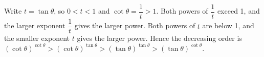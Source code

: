 Write $t=\tan\theta$, so $0<t<1$ and $\cot\theta=\dfrac{1}{t}>1$. Both powers of $\dfrac{1}{t}$ exceed 1, and the larger exponent $\dfrac{1}{t}$ gives the larger power. Both powers of $t$ are below 1, and the smaller exponent $t$ gives the larger power. Hence the decreasing order is $\boxed{(\cot\theta)^{\cot\theta}>(\cot\theta)^{\tan\theta}>(\tan\theta)^{\tan\theta}>(\tan\theta)^{\cot\theta}}$.
